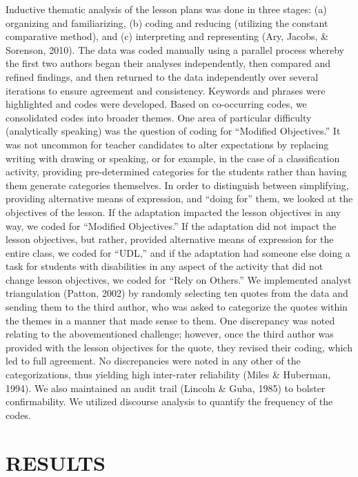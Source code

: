\documentclass[11.5pt]{sig-alternate} %
\begin{document}
\begin{large}
Inductive thematic analysis of the lesson plans was done in three stages: (a) organizing and familiarizing, (b) coding and reducing (utilizing the constant comparative method), and (c) interpreting and representing (Ary, Jacobs, \& Sorenson, 2010). The data was coded manually using a parallel process whereby the first two authors began their analyses independently, then compared and refined findings, and then returned to the data independently over several iterations to ensure agreement and consistency. Keywords and phrases were highlighted and codes were developed.  Based on co-occurring codes, we consolidated codes into broader themes.  One area of particular difficulty (analytically speaking) was the question of coding for “Modified Objectives.”  It was not uncommon for teacher candidates to alter expectations by replacing writing with drawing or speaking, or for example, in the case of a classification activity, providing pre-determined categories for the students rather than having them generate categories themselves. In order to distinguish between simplifying, providing alternative means of expression, and “doing for” them, we looked at the objectives of the lesson.  If the adaptation impacted the lesson objectives in any way, we coded for “Modified Objectives.” If the adaptation did not impact the lesson objectives, but rather, provided alternative means of expression for the entire class, we coded for “UDL,” and if the adaptation had someone else doing a task for students with disabilities in any aspect of the activity that did not change lesson objectives, we coded for “Rely on Others.” We implemented analyst triangulation (Patton, 2002) by randomly selecting ten quotes from the data and sending them to the third author, who was asked to categorize the quotes within the themes in a manner that made sense to them. One discrepancy was noted relating to the abovementioned challenge; however, once the third author was provided with the lesson objectives for the quote, they revised their coding, which led to full agreement. No discrepancies were noted in any other of the categorizations, thus yielding high inter-rater reliability (Miles \& Huberman, 1994).  We also maintained an audit trail (Lincoln \& Guba, 1985) to bolster confirmability. We utilized discourse analysis to quantify the frequency of the codes. 

\section*{RESULTS}


\end{large}
\end{document}
